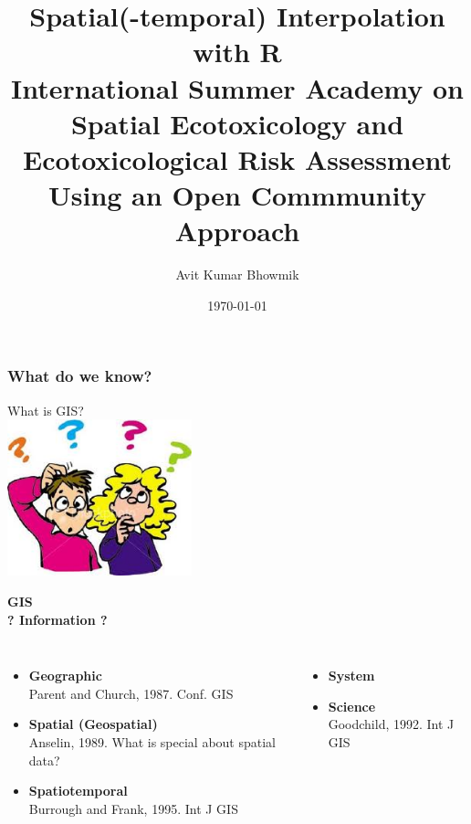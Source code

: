 \documentclass{beamer}
\title[Spatial Interpolation. Summer Academy `15]{Spatial(-temporal) Interpolation with R\\
\medskip \tiny{International Summer Academy on Spatial Ecotoxicology and Ecotoxicological Risk Assessment\\Using an Open Commmunity Approach}} %
\author[Avit Bhowmik]{Avit Kumar Bhowmik \\} %
\institute[Uni Koblenz-Landau] %
{
Institute for Environmental Sciences, University of Koblenz-Landau \\ %
\medskip
\textit{bhowmik@uni-landau.de}%
}
\date{\today} %
\begin{document}
\begin{frame}
\titlepage %
\end{frame}


\begin{frame}
\frametitle{What do we know?}
\centering
\Huge \alert{What is GIS?}\\
\vspace{1cm}
\includegraphics[width=0.4\textwidth]{Figures/Questions.png}
\end{frame}


\begin{frame}
\centering
\Huge \alert{\textbf{GIS}}\\
\pause
\Large \textbf{? Information ?}
\pause
\medskip
\normalsize
\begin{columns}[t]
\begin{itemize}
\item \alert{\textbf{Geographic}}\\
Parent and Church, 1987. Conf. GIS
\item \alert {\textbf {Spatial (Geospatial)}}\\
Anselin, 1989. What is special about spatial data?
\item \alert{\textbf{Spatiotemporal}}\\
Burrough and Frank, 1995. Int J GIS
\end{itemize}
\hspace{2cm}
\pause
{}
\begin{itemize}
\item \alert{\textbf{System}}
\item \alert{\textbf{Science}}\\
Goodchild, 1992. Int J GIS
\end{itemize}
\end{columns}
\end{frame}
\end{document}
